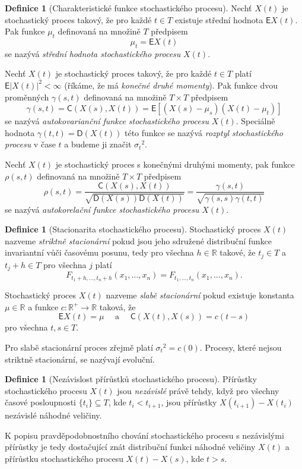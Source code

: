 \documentclass[a4paper,12pt]{report}
\theoremstyle{definition} \newtheorem{definice}[veta]{Definice}
\theoremstyle{remark}
\begin{document}
\begin{definice}[Charakteristické funkce stochastického procesu]
Nechť $X(t)$ je stochastický proces takový, že pro každé $t\in T$ existuje střední hodnota $\mathsf{E}{X(t)}$.
Pak funkce $\mu_t$ definovaná na množině $T$ předpisem
$$\mu_t=\mathsf{E}{X(t)}$$
se nazývá \textit{střední hodnota stochastického procesu} $X(t)$.

Nechť $X(t)$ je stochastický proces takový, že pro každé $t\in T$ platí $\mathsf{E}{|X(t)|^2<\infty}$ (říkáme, že má \textit{konečné druhé momenty}).
Pak funkce dvou proměnných $\gamma(s,t)$ definovaná na množině $T\times T$ předpisem
$$\gamma(s,t)=\mathsf{C}(X(s),X(t))=\mathsf{E}{\left[(X(s)-\mu_s)(X(t)-\mu_t)\right]}$$
se nazývá \textit{autokovarianční funkce stochastického procesu} $X(t)$.  
Speciálně hodnota $\gamma(t,t)=\mathsf{D}(X(t))$ této funkce se nazývá \textit{rozptyl stochastického procesu} v čase $t$ a budeme ji značit ${\sigma_t}^2$.

Nechť $X(t)$ je stochastický proces s konečnými druhými momenty,
pak funkce $\rho(s,t)$ definovaná na množině $T\times T$ předpisem
$$\rho(s,t)=\frac{\mathsf{C}(X(s),X(t))}{\sqrt{\mathsf{D}(X(s))\mathsf{D}(X(t))}}=\frac{\gamma(s,t)}{\sqrt{\gamma(s,s)\gamma(t,t)}}$$
se nazývá \textit{autokorelační funkce stochastického procesu} $X(t)$.
\end{definice}

\begin{definice}[Stacionarita stochastického procesu]
Stochastický proces $X(t)$ nazveme \textit{striktně stacionární} pokud jsou jeho sdružené distribuční funkce invariantní vůči časovému posunu, tedy pro všechna $h\in\mathbb{R}$ takové, že $t_j\in T$ a $t_j+h\in T$ pro všechna $j$ platí
$$F_{t_1+h,\dots,t_n+h}(x_1,\dots,x_n)=F_{t_1,\dots,t_n}(x_1,\dots,x_n).$$   

Stochastický proces $X(t)$ nazveme \textit{slabě stacionární} pokud existuje konstanta $\mu\in\mathbb{R}$ a funkce $c:\mathbb{R}^+\to\mathbb{R}$ taková, že
$$\mathsf{E}{X(t)}=\mu\quad\text{ a }\quad\mathsf{C}(X(t),X(s))=c(t-s)$$
pro všechna $t,s\in T$.
\end{definice}
Pro slabě stacionární proces zřejmě platí ${\sigma_t}^2=c(0)$.
Procesy, které nejsou striktně stacionární, se nazývají evoluční. 

\begin{definice}[Nezávislost přírůstků stochastického procesu]
Přírůstky stochastického procesu $X(t)$ jsou \textit{nezávislé} právě tehdy, když pro všechny časové posloupnosti $\{t_i\}\subseteq T$, kde $t_i<t_{i+1}$, jsou přírůstky $X(t_{i+1})-X(t_i)$ nezávislé náhodné veličiny.
\end{definice}
K popisu pravděpodobnostního chování stochastického procesu s nezávislými přírůstky je tedy dostačující znát distribuční funkci náhodné veličiny $X(t)$ a přírůstku stochastického procesu $X(t)-X(s)$, %
kde $t>s$.
\end{document}
